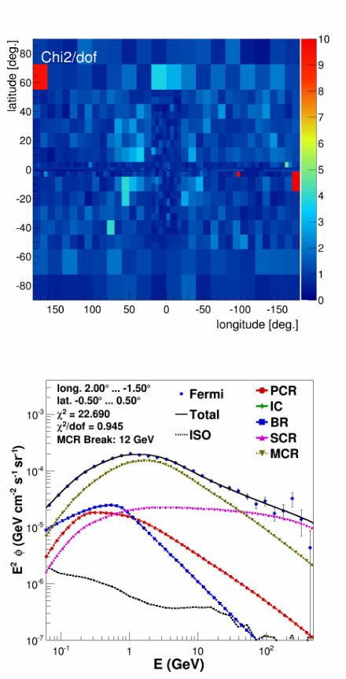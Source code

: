 \begin{figure}[h]
  \centering
  \begin{minipage}[h]{0.45\textwidth}
  	\centering
	\includegraphics[width=1.\linewidth]{pic/results/MCRonly_chi2Distribution.png}
  	\label{fig:MCRonly_chi2Distribution}
  \end{minipage}
  \hfill
  \begin{minipage}[h]{0.45\textwidth}
  	\centering
	\includegraphics[width=\linewidth]{pic/results/MCRonly_CMZ.png}

\end{minipage}
\end{figure}
